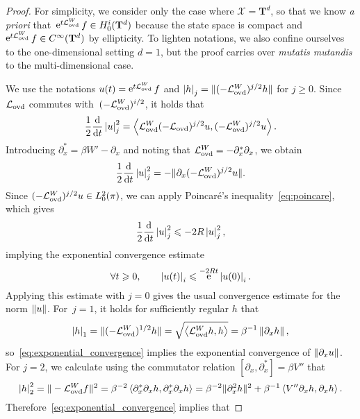 \documentclass[11pt,a4paper]{article}
\DeclareMathOperator{\e}{e}
\newcommand{\commut}[2]{[#1, #2]}
\newcommand{\torus}{\mathbf T}
\theoremstyle{plain}
\numberwithin{equation}{section}
\renewcommand{\leq}{\leqslant}
\renewcommand{\geq}{\geqslant}
\begin{document}
\begin{proof}
    For simplicity, we consider only the case where $\mathcal X = \torus^d$,
    so that we know \emph{a priori} that~$\e^{t \mathcal L_{\rm ovd}^W} f \in H^i_0(\torus^d)$ because
    the state space is compact and $\e^{t \mathcal L_{\rm ovd}^W} f \in C^{\infty}(\torus^d)$ by ellipticity.
    To lighten notations,
    we also confine ourselves to the one-dimensional setting $d = 1$,
    but the proof carries over \emph{mutatis mutandis} to the multi-dimensional case.

    We use the notations $u(t) = \e^{t \mathcal L_{\rm ovd}^W} f$ and
     $\seminorm{h}_j = \norm*{(- \mathcal L_{\rm ovd}^W)^{j/2} h}$ for $j \geq 0$.
    Since $\mathcal L_{\rm ovd}$ commutes with~$(-\mathcal L_{\rm ovd}^W)^{i/2}$,
    it holds that
    \[
        \frac{1}{2} \derivative*{1}{t} \seminorm{u}_j^2 = \ip{\mathcal L_{\rm ovd}^W (-\mathcal L_{\rm ovd})^{j/2} u}{(- \mathcal L_{\rm ovd}^W)^{j/2} u}.
    \]
    Introducing $\partial_x^* = \beta W' - \partial_x$
    and noting that $\mathcal L_{\rm ovd}^W = - \partial_x^* \partial_x$,
    we obtain
    \[
        \frac{1}{2} \derivative*{1}{t} \seminorm{u}_j^2 = - \norm*{\partial_x (-\mathcal L_{\rm ovd}^W)^{j/2} u}.
    \]
    Since $(-\mathcal L_{\rm ovd}^W)^{j/2} u \in L^2_0(\pi)$,
    we can apply Poincar\'e's inequality~\eqref{eq:poincare},
    which gives
    \[
        \frac{1}{2} \derivative*{1}{t} \seminorm{u}_j^2 \leq - 2R \seminorm{u}_j^2,
    \]
    implying the exponential convergence estimate
    \begin{equation}
        \label{eq:exponential_convergence}
        \forall t \geq 0, \qquad
        \seminorm{u(t)}_i \leq \e^{- 2 R t} \seminorm{u(0)}_i.
    \end{equation}
    Applying this estimate with $j = 0$ gives the usual convergence estimate for the norm $\norm{u}$.
    For~$j = 1$, it holds for sufficiently regular $h$ that
    \[
        \seminorm{h}_1 = \norm*{(- \mathcal L_{\rm ovd}^W)^{1/2} h} = \sqrt{\ip{\mathcal L_{\rm ovd}^W h}{h}} = \beta^{-1} \norm{\partial_x h},
    \]
    so~\eqref{eq:exponential_convergence} implies the exponential convergence of $\norm{\partial_x u}$.
    For $j = 2$, we calculate using the commutator relation $\commut{\partial_x}{\partial_x^*} = \beta V''$ that
    \[
        \seminorm{h}_2^2 = \norm*{- \mathcal L_{\rm ovd}^Wf}^2
        = \beta^{-2} \ip{\partial_x^* \partial_x h}{\partial_x^* \partial_x h}
        = \beta^{-2} \norm*{\partial_x^2 h}^2 + \beta^{-1} \ip{V'' \partial_x h}{\partial_x h}.
    \]
    Therefore~\eqref{eq:exponential_convergence} implies that

\end{proof}
\end{document}
